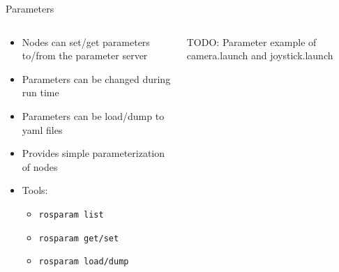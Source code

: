 \documentclass{beamer}
\newcommand{\bashinline}[1]{\texttt{#1}}
\begin{document}
\begin{frame}{Parameters}
	\begin{columns}
		\begin{column}{0.6\textwidth}
			\begin{itemize}
				\item Nodes can set/get parameters to/from the parameter server
				\item Parameters can be changed during run time
				\item Parameters can be load/dump to yaml files 
				\item Provides simple parameterization of nodes
				\item Tools:
					\begin{itemize}
						\item \bashinline{rosparam list}
						\item \bashinline{rosparam get/set}
						\item \bashinline{rosparam load/dump}
					\end{itemize}
			\end{itemize}
		\end{column}
	\begin{column}{0.4\textwidth}
		\centering
		TODO: Parameter example of camera.launch and joystick.launch
		\end{column}
	\end{columns}
\end{frame}
\end{document}
